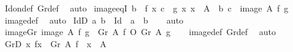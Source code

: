 \begin{isabellebody}
\isamarkupfalse%
\ Id{\isacharunderscore}{\kern0pt}on{\isacharunderscore}{\kern0pt}def\ Gr{\isacharunderscore}{\kern0pt}def\ \isamarkupfalse%
\ auto%
\endisatagproof
{\isafoldproof}%
%
\isadelimproof
\isanewline
%
\endisadelimproof
\isanewline
{}\isamarkupfalse%
\ image{}{\isacharunderscore}{\kern0pt}eqI{\isacharcolon}{\kern0pt}\ {\isachardoublequoteopen}{\isasymlbrakk}b\ {\isacharequal}{\kern0pt}\ f\ x{\isacharsemicolon}{\kern0pt}\ c\ {\isacharequal}{\kern0pt}\ g\ x{\isacharsemicolon}{\kern0pt}\ x\ {\isasymin}\ A{\isasymrbrakk}\ {\isasymLongrightarrow}\ {\isacharparenleft}{\kern0pt}b{\isacharcomma}{\kern0pt}\ c{\isacharparenright}{\kern0pt}\ {\isasymin}\ image{}\ A\ f\ g{\isachardoublequoteclose}\isanewline
%
\isadelimproof
\ \ %
\endisadelimproof
%
\isatagproof
{}\isamarkupfalse%
\ image{}{\isacharunderscore}{\kern0pt}def\ \isamarkupfalse%
\ auto%
\endisatagproof
{\isafoldproof}%
%
\isadelimproof
\isanewline
%
\endisadelimproof
\isanewline
{}\isamarkupfalse%
\ IdD{\isacharcolon}{\kern0pt}\ {\isachardoublequoteopen}{\isacharparenleft}{\kern0pt}a{\isacharcomma}{\kern0pt}\ b{\isacharparenright}{\kern0pt}\ {\isasymin}\ Id\ {\isasymLongrightarrow}\ a\ {\isacharequal}{\kern0pt}\ b{\isachardoublequoteclose}\isanewline
%
\isadelimproof
\ \ %
\endisadelimproof
%
\isatagproof
{}\isamarkupfalse%
\ auto%
\endisatagproof
{\isafoldproof}%
%
\isadelimproof
\isanewline
%
\endisadelimproof
\isanewline
{}\isamarkupfalse%
\ image{}{\isacharunderscore}{\kern0pt}Gr{\isacharcolon}{\kern0pt}\ {\isachardoublequoteopen}image{}\ A\ f\ g\ {\isacharequal}{\kern0pt}\ {\isacharparenleft}{\kern0pt}Gr\ A\ f{\isacharparenright}{\kern0pt}{\isasyminverse}\ O\ {\isacharparenleft}{\kern0pt}Gr\ A\ g{\isacharparenright}{\kern0pt}{\isachardoublequoteclose}\isanewline
%
\isadelimproof
\ \ %
\endisadelimproof
%
\isatagproof
{}\isamarkupfalse%
\ image{}{\isacharunderscore}{\kern0pt}def\ Gr{\isacharunderscore}{\kern0pt}def\ \isamarkupfalse%
\ auto%
\endisatagproof
{\isafoldproof}%
%
\isadelimproof
\isanewline
%
\endisadelimproof
\isanewline
{}\isamarkupfalse%
\ GrD{}{\isacharcolon}{\kern0pt}\ {\isachardoublequoteopen}{\isacharparenleft}{\kern0pt}x{\isacharcomma}{\kern0pt}\ fx{\isacharparenright}{\kern0pt}\ {\isasymin}\ Gr\ A\ f\ {\isasymLongrightarrow}\ x\ {\isasymin}\ A{\isachardoublequoteclose}\isanewline
%
\isadelimproof
\ \ %
\endisadelimproof

\end{isabellebody}
